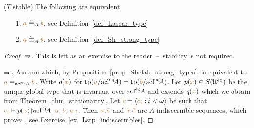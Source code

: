 


\begin{corollary}
($T$ stable)
The following are equivalent
\begin{itemize}
\item[1.] ${\mr a}\equivL_A{\mr b}$, see Definition~\ref{def_Lascar_type}
\item[2.] ${\mr a}\equivSh_A{\mr b}$, see Definition~\ref{def_Sh_strong_type}
\end{itemize}
\end{corollary}
\begin{proof}$\Rightarrow$.
  This is left as an exercise to the reader~--~stability is not required.

  $\Rightarrow$.
  Assume  which, by Proposition~\ref{prop_Shelah_strong_types}, is equivalent to ${\color{brown} a}\equiv_{{\rm acl}^{{\rm eq}}\!A}{\color{brown} b}$.
  Write $q({\color{brown} x})$ for ${\rm tp}({\color{brown} a}/{{\rm acl}}^{{\rm eq}}\!A)={\rm tp}({\color{brown} b}/{{\rm acl}}^{{\rm eq}}\!A)$. Let $p({\color{brown} x})\in S(\EuScript U^{{\rm eq}})$ be the unique global type that is invariant over ${\rm acl}^{{\rm eq}}\!A$ and extends $q({\color{brown} x})$ which we obtain from Theorem~\ref{thm_stationarity}.
  Let ${\color{brown}\bar c}=\langle{\color{brown}c_i}:i<\omega\rangle$ be such that ${\color{brown} c_i}\vDash p({\color{brown} x}){\restriction}{\rm acl}^{{\rm eq}}\!A,\,{\color{brown} a},\,{\color{brown} b},\,{\color{brown} c_{\restriction i}}$.
  Then ${\color{brown} a},{\color{brown}\bar c}$ and ${\color{brown} b},{\color{brown}\bar c}$ are $A$-indiscernible sequences, which proves , see Exercise~\ref{ex_Lstp_indiscernibles}.
\end{proof}


